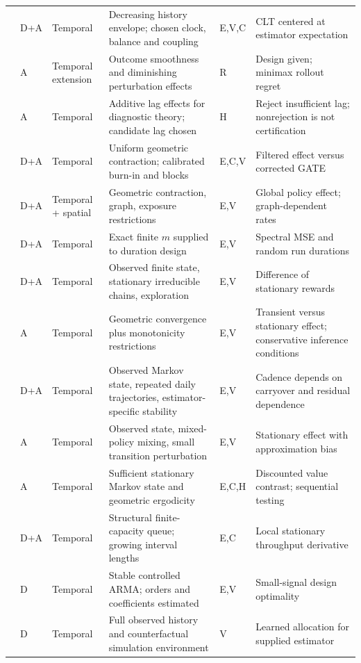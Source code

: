 \documentclass[12pt]{article}
\begin{document}
\begin{singlespace}
\begin{longtable}{P{3.2cm}P{0.9cm}P{1.8cm}P{4.5cm}P{1.3cm}P{3.3cm}}
\citet{ni2025model} & D+A & Temporal & Decreasing history envelope; chosen clock, balance and coupling & E,V,C & CLT centered at estimator expectation\\
\citet{ni2025decision} & A & Temporal extension & Outcome smoothness and diminishing perturbation effects & R & Design given; minimax rollout regret\\
\citet{carryover2025} & A & Temporal & Additive lag effects for diagnostic theory; candidate lag chosen & H & Reject insufficient lag; nonrejection is not certification\\
\citet{huwager2025} & D+A & Temporal & Uniform geometric contraction; calibrated burn-in and blocks & E,C,V & Filtered effect versus corrected GATE\\
\citet{jia2025} & D+A & Temporal + spatial & Geometric contraction, graph, exposure restrictions & E,V & Global policy effect; graph-dependent rates\\
\citet{hu2026} & D+A & Temporal & Exact finite $m$ supplied to duration design & E,V & Spectral MSE and random run durations\\
\citet{glynn2020} & D+A & Temporal & Observed finite state, stationary irreducible chains, exploration & E,V & Difference of stationary rewards\\
\citet{blanchet2026} & A & Temporal & Geometric convergence plus monotonicity restrictions & E,V & Transient versus stationary effect; conservative inference conditions\\
\citet{wen2025} & D+A & Temporal & Observed Markov state, repeated daily trajectories, estimator-specific stability & E,V & Cadence depends on carryover and residual dependence\\
\citet{farias2022} & A & Temporal & Observed state, mixed-policy mixing, small transition perturbation & E,V & Stationary effect with approximation bias\\
\citet{shi2023} & A & Temporal & Sufficient stationary Markov state and geometric ergodicity & E,C,H & Discounted value contrast; sequential testing\\
\citet{li2026} & D+A & Temporal & Structural finite-capacity queue; growing interval lengths & E,C & Local stationary throughput derivative\\
\citet{sun2024} & D & Temporal & Stable controlled ARMA; orders and coefficients estimated & E,V & Small-signal design optimality\\
\citet{wu2026} & D & Temporal & Full observed history and counterfactual simulation environment & V & Learned allocation for supplied estimator\\

\end{longtable}
\end{singlespace}
\end{document}
